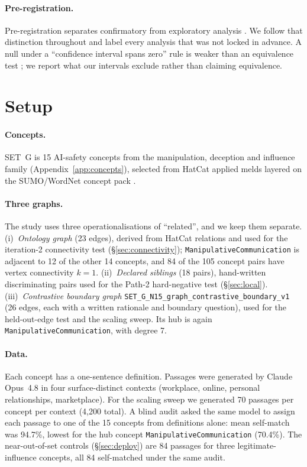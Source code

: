 \documentclass[11pt]{article}
\begin{document}
\paragraph{Pre-registration.} Pre-registration separates confirmatory from exploratory analysis
\citep{nosek2018prereg}. We follow that distinction throughout and label every analysis that was not locked in
advance. A null under a ``confidence interval spans zero'' rule is weaker than an equivalence test
\citep{lakens2017equivalence}; we report what our intervals exclude rather than claiming equivalence.

\section{Setup}
\label{sec:setup}

\paragraph{Concepts.} SET~G is 15 AI-safety concepts from the manipulation, deception and influence family
(Appendix~\ref{app:concepts}), selected from HatCat applied melds layered on the SUMO/WordNet concept pack
\citep{hatcat,niles2001sumo,fellbaum1998wordnet}.

\paragraph{Three graphs.} The study uses three operationalisations of ``related'', and we keep them separate.
(i)~\emph{Ontology graph} (23 edges), derived from HatCat relations and used for the iteration-2 connectivity test
(\S\ref{sec:connectivity}); \texttt{ManipulativeCommunication} is adjacent to 12 of the other 14 concepts, and 84
of the 105 concept pairs have vertex connectivity $k=1$. (ii)~\emph{Declared siblings} (18 pairs), hand-written
discriminating pairs used for the Path-2 hard-negative test (\S\ref{sec:local}). (iii)~\emph{Contrastive boundary
graph} \texttt{SET\_G\_N15\_graph\_contrastive\_boundary\_v1} (26 edges, each with a written rationale and boundary
question), used for the held-out-edge test and the scaling sweep. Its hub is again
\texttt{ManipulativeCommunication}, with degree 7.

\paragraph{Data.} Each concept has a one-sentence definition. Passages were generated by Claude Opus~4.8
\citep{anthropic2026opus48} in four surface-distinct contexts (workplace, online, personal relationships,
marketplace). For the scaling sweep we generated 70 passages per concept per context (4,200 total). A blind audit
asked the same model to assign each passage to one of the 15 concepts from definitions alone: mean self-match was
94.7\%, lowest for the hub concept \texttt{ManipulativeCommunication} (70.4\%). The near-out-of-set controls
(\S\ref{sec:deploy}) are 84 passages for three legitimate-influence concepts, all 84 self-matched under the same
audit.
\end{document}

